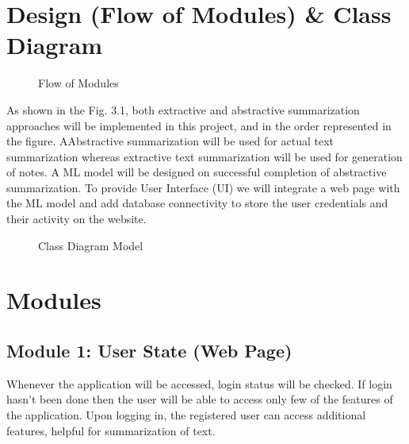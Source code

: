 \section{Design (Flow of Modules) \& Class Diagram}
\begin{figure}[h]
\centering
{}
\caption{Flow of Modules}
\label{Flow of Modules}
\end{figure}
As shown in the Fig. 3.1, both extractive and abstractive summarization approaches will be implemented in this project, and in the order represented in the figure. AAbstractive summarization will be used for actual text summarization whereas extractive text summarization will be used for generation of notes. A ML model will be designed on successful completion of abstractive summarization. To provide User Interface (UI) we will integrate a web page with the ML model and add database connectivity to store the user credentials and their activity on the website.
\begin{figure}[h]
\centering
{}
\caption{Class Diagram Model}
\label{Class Diagram Model}
\end{figure}

\section{Modules}
\subsection{Module 1: User State (Web Page)}
Whenever the application will be accessed, login status will be checked.
If login hasn’t been done then the user will be able to access only few of the features of the application.
Upon logging in, the registered user can access additional features, helpful for summarization of text.

